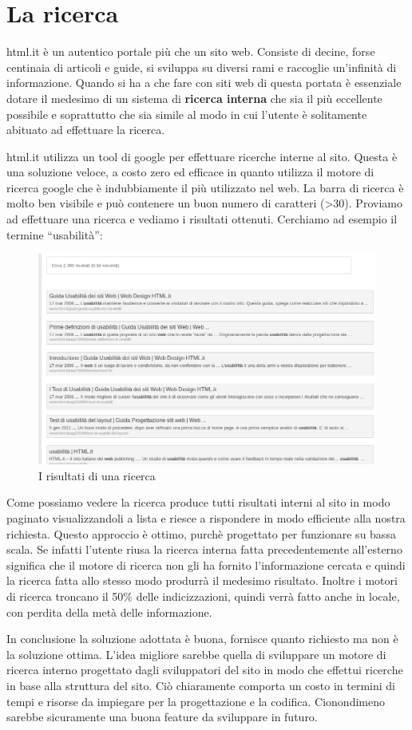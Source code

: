 \section{La ricerca}

html.it è un autentico portale più che un sito web. Consiste di decine, forse centinaia di articoli e guide, si sviluppa su diversi rami e raccoglie un'infinità di informazione. Quando si ha a che fare con siti web di questa portata è essenziale dotare il medesimo di un sistema di \textbf{ricerca interna} che sia il più eccellente possibile e soprattutto che sia simile al modo in cui l'utente è solitamente abituato ad effettuare la ricerca.

html.it utilizza un tool di google per effettuare ricerche interne al sito. Questa è una soluzione veloce, a costo zero ed efficace in quanto utilizza il motore di ricerca google che è indubbiamente il più utilizzato nel web. La barra di ricerca è molto ben visibile e può contenere un buon numero di caratteri (>30). Proviamo ad effettuare una ricerca e vediamo i risultati ottenuti. Cerchiamo ad esempio il termine ``usabilità'':

\begin{figure}[H]
\centering
\includegraphics[width=120mm]{images/search.png}
\caption{I risultati di una ricerca}
\end{figure}

Come possiamo vedere la ricerca produce tutti risultati interni al sito in modo paginato visualizzandoli a lista e riesce a rispondere in modo efficiente alla nostra richiesta. Questo approccio è ottimo, purchè progettato per funzionare su bassa scala. Se infatti l'utente riusa la ricerca interna fatta precedentemente all'esterno significa che il motore di ricerca non gli ha fornito l'informazione cercata e quindi la ricerca fatta allo stesso modo produrrà il medesimo risultato. Inoltre i motori di ricerca troncano il 50\% delle indicizzazioni, quindi verrà fatto anche in locale, con perdita della metà delle informazione.

In conclusione la soluzione adottata è buona, fornisce quanto richiesto ma non è la soluzione ottima. L'idea migliore sarebbe quella di sviluppare un motore di ricerca interno progettato dagli sviluppatori del sito in modo che effettui ricerche in base alla struttura del sito. Ciò chiaramente comporta un costo in termini di tempi e risorse da impiegare per la progettazione e la codifica. Cionondimeno sarebbe sicuramente una buona feature da sviluppare in futuro.


